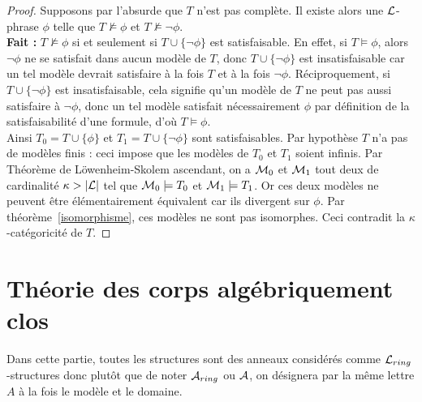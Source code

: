 \begin{proof}
Supposons par l'absurde que $T$ n'est pas complète. Il existe alors une $\mathcal{L}$-phrase $\phi$ telle que $T \not\models \phi$ et $T \not\models \neg\phi$.\\
\textbf{Fait :} $T \not\models \phi$ si et seulement si $T \cup \{\neg\phi\}$ est satisfaisable. En effet, si $T \models \phi$, alors $\neg\phi$ ne se satisfait dans aucun modèle de $T$,
donc $T \cup \{\neg\phi\}$ est insatisfaisable car un tel modèle devrait satisfaire à la fois $T$ et à la fois $\neg\phi$. Réciproquement, si $T \cup \{\neg\phi\}$ est insatisfaisable,
cela signifie qu'un modèle de $T$ ne peut pas aussi satisfaire à $\neg\phi$, donc un tel modèle satisfait nécessairement $\phi$ par définition de la satisfaisabilité d'une formule, d'où $T \models \phi$. \\
Ainsi $T_0 = T \cup \{\phi\}$ et $T_1 = T \cup \{\neg\phi\}$ sont satisfaisables.
Par hypothèse $T$ n'a pas de modèles finis : ceci impose que les modèles de $T_0$ et $T_1$ soient infinis. Par Théorème de Löwenheim-Skolem ascendant, on a $\mathcal{M}_0$ et $\mathcal{M}_1$
tout deux de cardinalité $\kappa > \lvert \mathcal{L} \rvert$ tel que $\mathcal{M}_0 \models T_0$ et $\mathcal{M}_1 \models T_1$. Or ces deux modèles ne peuvent être élémentairement équivalent car ils divergent sur $\phi$.
Par théorème~\ref{isomorphisme}, ces modèles ne sont pas isomorphes. Ceci contradit la $\kappa$-catégoricité de $T$.
\end{proof}



\section{Théorie des corps algébriquement clos}

Dans cette partie, toutes les structures sont des anneaux considérés comme
$\mathcal{L}_{ring}$-structures donc plutôt que de noter $\mathcal{A}_{ring}$ ou $\mathcal{A}$, on
désignera par la même lettre $A$ à la fois le modèle et le domaine. 

